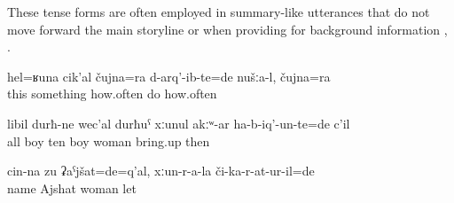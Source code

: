 These tense forms are often employed in summary-like utterances that do not move forward the main storyline  or when providing for background information , .
%
\begin{exe}
	\ex	\label{ex:Things like this, how often did we do them, how often}
	\gll	hel=ʁuna	cik'al	čujna=ra	d-arq'-ib-te=de	nušːa-l,	čujna=ra\\
		this	something	how.often	do		how.often\\
	\glt	{}
	
	\ex	\label{ex:All children, ten children (he) rose without his wife then}
	\gll	libil	durħ-ne	wec'al	durħuˁ	xːunul	akːʷ-ar		ha-b-iq'-un-te=de	c'il\\
		all	boy	ten	boy	woman 		bring.up	then\\
	\glt	{}

	\ex	\label{ex:‎Her name was Ajshat, she was sent there as the (leader) of the women}
	\gll	cin-na	zu	ʡaˁjšat=de=q'al,	xːun-r-a-la	či-ka-r-at-ur-il=de\\
			name	Ajshat	woman	let\\
	\glt	{}
\end{exe}

